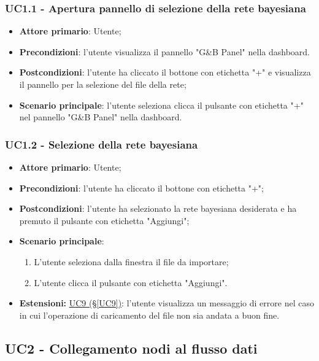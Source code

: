 \subsubsection{UC1.1 - Apertura pannello di selezione della rete bayesiana}\label{UC1.1}
\begin{itemize}
	\item \textbf{Attore primario}: Utente; 
	\item \textbf{Precondizioni}: l'utente visualizza il pannello "G\&B Panel" nella dashboard.
	\item \textbf{Postcondizioni}: l'utente ha cliccato il bottone con etichetta "+" e visualizza il pannello per la selezione del file della rete;
	\item \textbf{Scenario principale}: l'utente seleziona clicca il pulsante con etichetta "+" nel pannello "G\&B Panel" nella dashboard.
\end{itemize}


\subsubsection{UC1.2 - Selezione della rete bayesiana}\label{UC1.2}
\begin{itemize}
	\item \textbf{Attore primario}: Utente;
	\item \textbf{Precondizioni}: l'utente ha cliccato il bottone con etichetta "+";
	\item \textbf{Postcondizioni}: l'utente ha selezionato la rete bayesiana desiderata e ha premuto il pulsante con etichetta "Aggiungi";
	\item \textbf{Scenario principale}:
	\begin{enumerate}
		\item L'utente seleziona dalla finestra il file da importare;
		\item L'utente clicca il pulsante con etichetta "Aggiungi".
	\end{enumerate}
	\item \textbf{Estensioni:} \hyperref[UC9]{UC9 (§\ref*{UC9})}: l'utente visualizza un messaggio di errore nel caso in cui l'operazione di caricamento del file non sia andata a buon fine.
\end{itemize}

\pagebreak

\subsection{UC2 - Collegamento nodi al flusso dati}\label{UC2}

